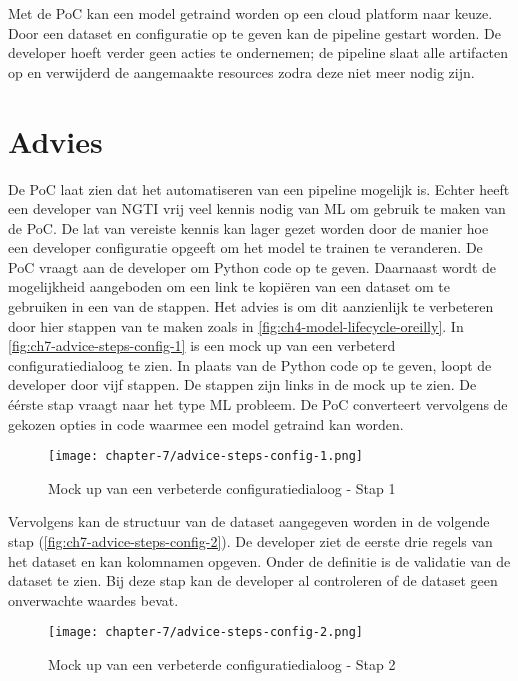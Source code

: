 Met de PoC kan een model getraind worden op een cloud platform naar keuze. Door een dataset en configuratie op te geven kan de pipeline gestart worden. De developer hoeft verder geen acties te ondernemen; de pipeline slaat alle artifacten op en verwijderd de aangemaakte resources zodra deze niet meer nodig zijn.

\section{Advies}\label{sec:ch7-advies}
De PoC laat zien dat het automatiseren van een pipeline mogelijk is. Echter heeft een developer van NGTI vrij veel kennis nodig van ML om gebruik te maken van de PoC. De lat van vereiste kennis kan lager gezet worden door de manier hoe een developer configuratie opgeeft om het model te trainen te veranderen. De PoC vraagt aan de developer om Python code op te geven. Daarnaast wordt de mogelijkheid aangeboden om een link te kopiëren van een dataset om te gebruiken in een van de stappen. Het advies is om dit aanzienlijk te verbeteren door hier stappen van te maken zoals in \autoref{fig:ch4-model-lifecycle-oreilly}. In \autoref{fig:ch7-advice-steps-config-1} is een mock up van een verbeterd configuratiedialoog te zien. In plaats van de Python code op te geven, loopt de developer door vijf stappen. De stappen zijn links in de mock up te zien. De éérste stap vraagt naar het type ML probleem. De PoC converteert vervolgens de gekozen opties in code waarmee een model getraind kan worden.

\newpage

\begin{figure}[hbt!]
  \centering
  \texttt{[image: chapter-7/advice-steps-config-1.png]}
  \caption{Mock up van een verbeterde configuratiedialoog - Stap 1}
  \label{fig:ch7-advice-steps-config-1}
\end{figure}

Vervolgens kan de structuur van de dataset aangegeven worden in de volgende stap (\autoref{fig:ch7-advice-steps-config-2}). De developer ziet de eerste drie regels van het dataset en kan kolomnamen opgeven. Onder de definitie is de validatie van de dataset te zien. Bij deze stap kan de developer al controleren of de dataset geen onverwachte waardes bevat.

\newpage

\begin{figure}[hbt!]
  \centering
  \texttt{[image: chapter-7/advice-steps-config-2.png]}
  \caption{Mock up van een verbeterde configuratiedialoog - Stap 2}
  \label{fig:ch7-advice-steps-config-2}
\end{figure}

